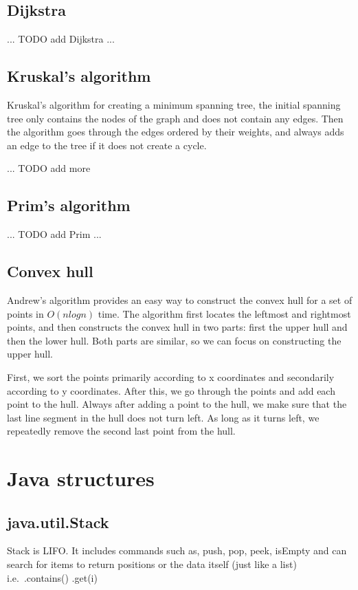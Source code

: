 \documentclass[a4paper]{article}
\begin{document}
\subsection{Dijkstra}
... TODO add Dijkstra ...


\subsection{Kruskal's algorithm}
Kruskal’s algorithm for creating a minimum spanning tree, the initial spanning tree only contains the nodes of the graph and does not contain any edges. Then the algorithm goes through the edges ordered by their weights, and always adds an edge to the tree if it does not create a cycle.


... TODO add more


\subsection{Prim's algorithm}
... TODO add Prim ...


\subsection{Convex hull}
Andrew’s algorithm provides an easy way to construct the convex hull for a set of points in $O(n log n)$ time. The algorithm first locates the leftmost and rightmost points, and then constructs the convex hull in two parts: first the upper hull and then the lower hull. Both parts are similar, so we can focus on constructing the upper hull.

First, we sort the points primarily according to x coordinates and secondarily according to y coordinates. After this, we go through the points and add each point to the hull. Always after adding a point to the hull, we make sure that the last line segment in the hull does not turn left. As long as it turns left, we repeatedly remove the second last point from the hull.



\section{Java structures}

\subsection{java.util.Stack}
Stack is LIFO. It includes commands such as, push, pop, peek, isEmpty and can search for items to return positions or the data itself (just like a list) i.e.\ .contains() .get(i)
\end{document}
